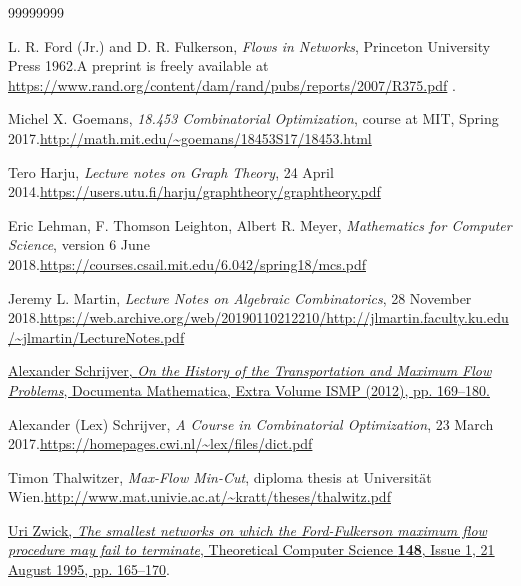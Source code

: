 \documentclass[numbers=enddot,12pt,final,onecolumn,notitlepage]{scrartcl}%
\theoremstyle{definition}
\begin{document}
\begin{thebibliography}{99999999}                                                                                         %


L. R. Ford (Jr.) and D. R. Fulkerson,
\textit{Flows in Networks}, Princeton University Press 1962.\newline A
preprint is freely available at
\url{https://www.rand.org/content/dam/rand/pubs/reports/2007/R375.pdf} .

Michel X. Goemans, \textit{18.453 Combinatorial
Optimization}, course at MIT, Spring 2017.\newline\url{http://math.mit.edu/~goemans/18453S17/18453.html}

Tero Harju, \textit{Lecture notes on Graph Theory},
24 April 2014.\newline\url{https://users.utu.fi/harju/graphtheory/graphtheory.pdf}

Eric Lehman, F. Thomson Leighton, Albert R. Meyer,
\textit{Mathematics for Computer Science}, version 6 June 2018.\newline\url{https://courses.csail.mit.edu/6.042/spring18/mcs.pdf}

Jeremy L. Martin, \textit{Lecture Notes on
Algebraic Combinatorics}, 28 November 2018.\newline\url{https://web.archive.org/web/20190110212210/http://jlmartin.faculty.ku.edu/~jlmartin/LectureNotes.pdf}

%
\href{https://www.math.uni-bielefeld.de/documenta/vol-ismp/33_schrijver-alexander-tmf.pdf}{Alexander
Schrijver, \textit{On the History of the Transportation and Maximum Flow
Problems}, Documenta Mathematica, Extra Volume ISMP (2012), pp. 169--180.}

Alexander (Lex) Schrijver, \textit{A Course in
Combinatorial Optimization}, 23 March 2017.\newline\url{https://homepages.cwi.nl/~lex/files/dict.pdf}

Timon Thalwitzer, \textit{Max-Flow Min-Cut},
diploma thesis at Universit\"{a}t Wien.\newline\url{http://www.mat.univie.ac.at/~kratt/theses/thalwitz.pdf}

%
\href{https://doi.org/10.1016/0304-3975(95)00022-O}{Uri Zwick, \textit{The
smallest networks on which the Ford-Fulkerson maximum flow procedure may fail
to terminate}, Theoretical Computer Science \textbf{148}, Issue 1, 21 August
1995, pp. 165--170}.
\end{thebibliography}
\end{document}
